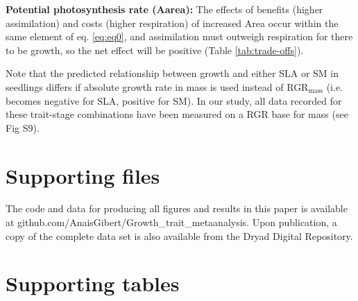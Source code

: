 \documentclass[a4paper,11pt]{article}
\begin{document}
\begin{appendices}
\textbf{Potential photosynthesis rate (Aarea):} The effects of benefits (higher assimilation) and costs (higher respiration) of increased Area occur within the same element of eq. \ref{eq:eq0}, and assimilation must outweigh respiration for there to be growth, so the net effect will be positive (Table \ref{tab:trade-offs}).

Note that the predicted relationship between growth and either SLA or SM in seedlings differs if absolute growth rate in mass is used instead of RGR$_\textrm{mass}$ (i.e. becomes negative for SLA, positive for SM). In our study, all data recorded for these trait-stage combinations have been measured on a RGR base for mass (see Fig S9).


\clearpage

\section{Supporting files}\label{app:supp_info_files}

The code and data for producing all figures and results in this paper is available at github.com/AnaisGibert/Growth\_trait\_metaanalysis.  Upon publication, a copy of the complete data set is also available from the Dryad Digital Repository.

\section{Supporting tables}\label{app:supp_info_tables}

\linespread{1}


\end{appendices}
\end{document}
